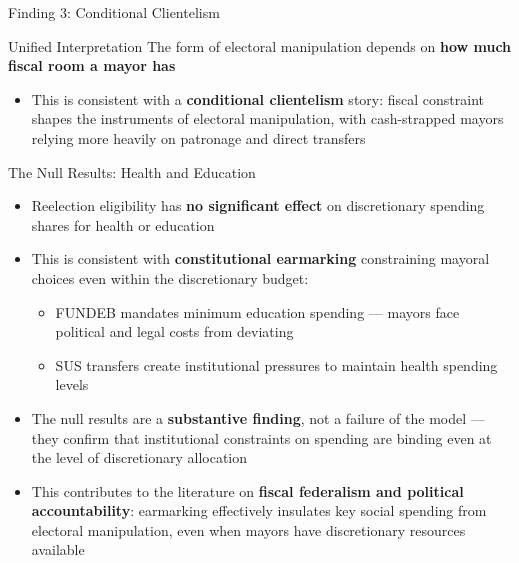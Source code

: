 \documentclass{beamer}
\begin{document}
\begin{frame}{Finding 3: Conditional Clientelism}
\begin{block}{Unified Interpretation}
The form of electoral manipulation depends on \textbf{how much fiscal room a mayor has}
\end{block}
\vspace{0.5em}
\begin{itemize}
    \item This is consistent with a \textbf{conditional clientelism} story: fiscal constraint shapes the instruments of electoral manipulation, with cash-strapped mayors relying more heavily on patronage and direct transfers
\end{itemize}
\end{frame}

\begin{frame}{The Null Results: Health and Education}
\begin{itemize}
    \item Reelection eligibility has \textbf{no significant effect} on discretionary spending shares for health or education
    \vspace{0.5em}
    \item This is consistent with \textbf{constitutional earmarking} constraining mayoral choices even within the discretionary budget:
    \begin{itemize}
        \item FUNDEB mandates minimum education spending --- mayors face political and legal costs from deviating
        \item SUS transfers create institutional pressures to maintain health spending levels
    \end{itemize}
    \vspace{0.5em}
    \item The null results are a \textbf{substantive finding}, not a failure of the model --- they confirm that institutional constraints on spending are binding even at the level of discretionary allocation
    \vspace{0.5em}
    \item This contributes to the literature on \textbf{fiscal federalism and political accountability}: earmarking effectively insulates key social spending from electoral manipulation, even when mayors have discretionary resources available
\end{itemize}
\end{frame}
\end{document}
